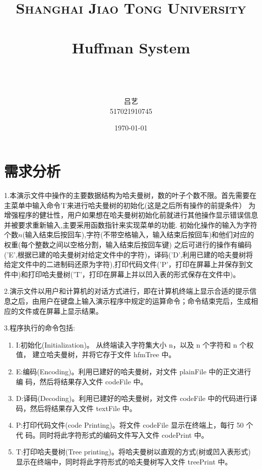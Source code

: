 \documentclass[paper=a4,UTF8,fontsize=11pt]{scrartcl} %
\title{
\normalfont \normalsize
\textsc{Shanghai Jiao Tong University} \\ [25pt] %
\horrule{0.5pt} \\[0.4cm] %
\huge Huffman System \\ %
\horrule{2pt} \\[0.5cm] %
}
\author{\\ \kaishu 吕艺\\ \normalsize 517021910745} %
\date{\normalsize\today} %
\numberwithin{equation}{section} %
\numberwithin{figure}{section} %
\numberwithin{table}{section} %
\begin{document}
\maketitle %
\kaishu
\section{需求分析}

1.本演示文件中操作的主要数据结构为哈夫曼树，数的叶子个数不限。首先需要在主菜单中输入命令'I'来进行哈夫曼树的初始化(这是之后所有操作的前提条件）
为增强程序的健壮性，用户如果想在哈夫曼树初始化前就进行其他操作显示错误信息并被要求重新输入,主要采用函数指针来实现菜单的功能.
初始化操作的输入为字符个数$n$(输入结束后按回车),字符(不带空格输入，输入结束后按回车)和他们对应的权重(每个整数之间以空格分割，输入结束后按回车键)
之后可进行的操作有编码('E',根据已建的哈夫曼树对给定文件中的字符)，译码('D',利用已建的哈夫曼树将给定文件中的二进制码还原为字符),打印代码文件('P'，打印在屏幕上并保存到文件中)和打印哈夫曼树('T'，打印在屏幕上并以凹入表的形式保存在文件中)。
\vspace{0.5cm}

2.演示文件以用户和计算机的对话方式进行，即在计算机终端上显示合适的提示信息之后，由用户在键盘上输入演示程序中规定的运算命令；命令结束完后，生成相应的文件或在屏幕上显示结果。
\vspace{0.5cm}
\newpage

3.程序执行的命令包括:
\begin{enumerate}
    \item I:初始化(Initialization)。 从终端读入字符集大小 n，以及 n 个字符和 n 个权值， 建立哈夫曼树，并将它存于文件 hfmTree 中。
    \item E:编码(Encoding)。利用已建好的哈夫曼树，对文件 plainFile 中的正文进行编 码，然后将结果存入文件 codeFile 中。
    \item D:译码(Decoding)。利用已建好的哈夫曼树，对文件 codeFile 中的代码进行译 码，然后将结果存入文件 textFile 中。
    \item P:打印代码文件(code Printing)。将文件 codeFile 显示在终端上，每行 50 个代 码。同时将此字符形式的编码文件写入文件 codePrint 中。
    \item T:打印哈夫曼树(Tree printing)。将哈夫曼树以直观的方式(树或凹入表形式) 显示在终端中，同时将此字符形式的哈夫曼树写入文件 treePrint 中。
\end{enumerate}

\vspace{0.8cm}
\end{document}
